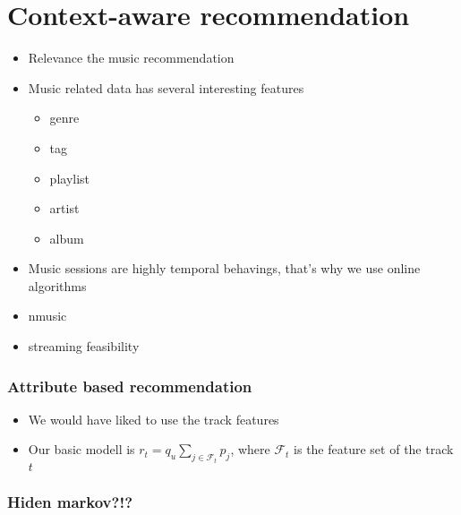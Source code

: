 \chapter{Context-aware recommendation}
\begin{itemize}
\item Relevance the music recommendation
\item Music related data has several interesting features
  \begin{itemize}
  \item genre
  \item tag
  \item playlist
  \item artist
  \item album
  \end{itemize}
\item Music sessions are highly temporal behavings, that's why we use online
  algorithms
\item nmusic
\item streaming feasibility
\end{itemize}

\subsection{Attribute based recommendation}
\begin{itemize}
\item We would have liked to use the track features
\item Our basic modell is $r_t = q_u \sum_{j\in\mathcal{F}_t}p_j$, where $\mathcal{F}_t$ is the feature set of the track $t$
\end{itemize}

\subsection{Hiden markov?!?}
